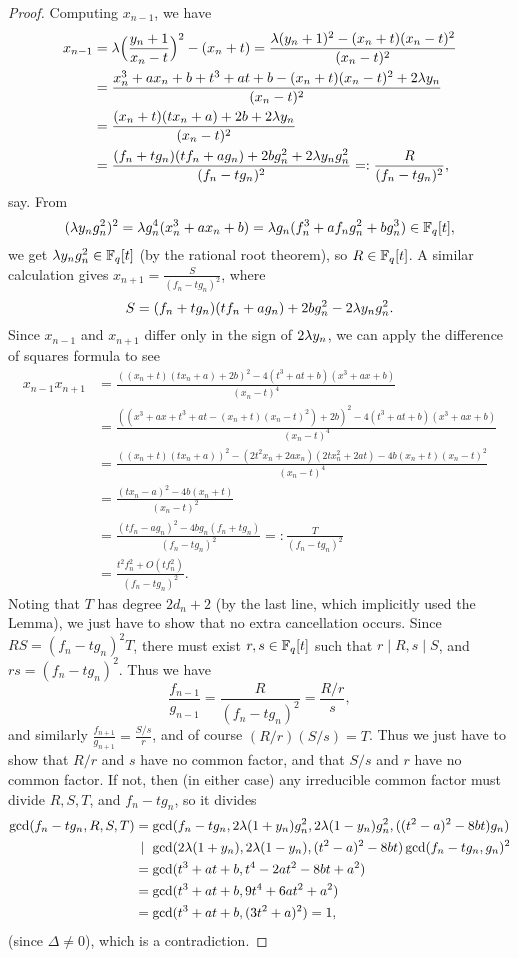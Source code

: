 \begin{proof}
Computing $x_{n-1}$, we have
\begin{align*}
x_{n-1} &= \lambda\Big(\frac{y_n+1}{x_n-t}\Big)^2 - (x_n+t) = \frac{\lambda(y_n+1)^2-(x_n+t)(x_n-t)^2}{(x_n-t)^2}\\
&= \frac{x_n^3+ax_n+b+t^3+at+b-(x_n+t)(x_n-t)^2+2\lambda y_n}{(x_n-t)^2}\\
&= \frac{(x_n+t)(tx_n+a)+2b+2\lambda y_n}{(x_n-t)^2}\\
&= \frac{(f_n+tg_n)(tf_n+ag_n)+2bg_n^2+2\lambda y_ng_n^2}{(f_n-tg_n)^2} =: \frac{R}{(f_n-tg_n)^2},
\end{align*}
say. From
\[
(\lambda y_ng_n^2)^2 = \lambda g_n^4(x_n^3+ax_n+b) = \lambda g_n(f_n^3 + af_ng_n^2 + bg_n^3) \in \mathbb{F}_q[t],
\]
we get $\lambda y_ng_n^2 \in \mathbb{F}_q[t]$ (by the rational root theorem), so $R \in \mathbb{F}_q[t]$. A similar calculation gives $x_{n+1} = \frac{S}{(f_n-tg_n)^2}$, where \[
S = (f_n+tg_n)(tf_n+ag_n)+2bg_n^2-2\lambda y_ng_n^2.
\]
Since $x_{n-1}$ and $x_{n+1}$ differ only in the sign of $2\lambda y_n$, we can apply the difference of squares formula to see
\begin{align*}
x_{n-1}x_{n+1} &= \frac{((x_n+t)(tx_n+a)+2b)^2-4(t^3+at+b)(x^3+ax+b)}{(x_n-t)^4}\\
&= \frac{((x^3+ax+t^3+at-(x_n+t)(x_n-t)^2)+2b)^2-4(t^3+at+b)(x^3+ax+b)}{(x_n-t)^4}\\
&= \frac{((x_n+t)(tx_n+a))^2-(2t^2x_n+2ax_n)(2tx_n^2+2at)-4b(x_n+t)(x_n-t)^2}{(x_n-t)^4}\\
&= \frac{(tx_n-a)^2-4b(x_n+t)}{(x_n-t)^2}\\
&= \frac{(tf_n-ag_n)^2-4bg_n(f_n+tg_n)}{(f_n-tg_n)^2} =: \frac{T}{(f_n-tg_n)^2}\\
&= \frac{t^2f_n^2 + O(tf_n^2)}{(f_n-tg_n)^2}.
\end{align*}
Noting that $T$ has degree $2d_n+2$ (by the last line, which implicitly used the Lemma), we just have to show that no extra cancellation occurs. Since $RS = (f_n-tg_n)^2T$, there must exist $r,s\in\mathbb{F}_q[t]$ such that $r\mid R, s\mid S$, and $rs = (f_n-tg_n)^2$. Thus we have
\[
\frac{f_{n-1}}{g_{n-1}} = \frac{R}{(f_n-tg_n)^2} = \frac{R/r}{s},
\]
and similarly $\frac{f_{n+1}}{g_{n+1}} = \frac{S/s}{r}$, and of course $(R/r)(S/s) = T$. Thus we just have to show that $R/r$ and $s$ have no common factor, and that $S/s$ and $r$ have no common factor. If not, then (in either case) any irreducible common factor must divide $R,S,T$, and $f_n-tg_n$, so it divides
\begin{align*}
\gcd(f_n-tg_n,R,S,T) &= \gcd(f_n-tg_n, 2\lambda(1+y_n)g_n^2, 2\lambda(1-y_n)g_n^2, ((t^2-a)^2-8bt)g_n)\\
&\,\mid\ \gcd(2\lambda(1+y_n), 2\lambda(1-y_n), (t^2-a)^2-8bt)\gcd(f_n-tg_n,g_n)^2\\
&= \gcd(t^3+at+b, t^4 - 2at^2 - 8bt + a^2)\\
&= \gcd(t^3+at+b, 9t^4 + 6at^2 + a^2)\\
&= \gcd(t^3+at+b, (3t^2+a)^2) = 1,
\end{align*}
(since $\Delta \ne 0$), which is a contradiction.
\end{proof}

